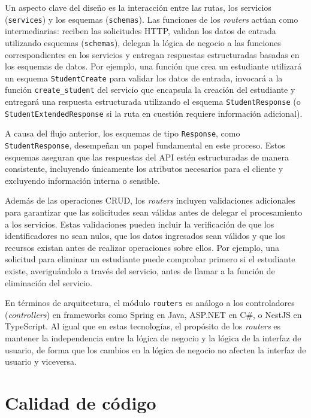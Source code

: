 Un aspecto clave del diseño es la interacción entre las rutas, los servicios (\lstinline|services|) y los esquemas (\lstinline|schemas|). Las funciones de los \textit{routers} actúan como intermediarias: reciben las solicitudes \gls{HTTP}, validan los datos de entrada utilizando esquemas (\lstinline|schemas|), delegan la lógica de negocio a las funciones correspondientes en los servicios y entregan respuestas estructuradas basadas en los esquemas de datos. Por ejemplo, una función que crea un estudiante utilizará un esquema \lstinline|StudentCreate| para validar los datos de entrada, invocará a la función \lstinline|create_student| del servicio que encapsula la creación del estudiante y entregará una respuesta estructurada utilizando el esquema \lstinline|StudentResponse| (o \lstinline|StudentExtendedResponse| si la ruta en cuestión requiere información adicional).

\sloppy
A causa del flujo anterior, los esquemas de tipo \lstinline|Response|, como \lstinline|StudentResponse|, desempeñan un papel fundamental en este proceso. Estos esquemas aseguran que las respuestas del \gls{API} estén estructuradas de manera consistente, incluyendo únicamente los atributos necesarios para el cliente y excluyendo información interna o sensible.
\fussy

Además de las operaciones \gls{CRUD}, los \textit{routers} incluyen validaciones adicionales para garantizar que las solicitudes sean válidas antes de delegar el procesamiento a los servicios. Estas validaciones pueden incluir la verificación de que los identificadores no sean nulos, que los datos ingresados sean válidos y que los recursos existan antes de realizar operaciones sobre ellos. Por ejemplo, una solicitud para eliminar un estudiante puede comprobar primero si el estudiante existe, averiguándolo a través del servicio, antes de llamar a la función de eliminación del servicio.

En términos de arquitectura, el módulo \lstinline|routers| es análogo a los controladores (\textit{controllers}) en frameworks como Spring en Java, ASP.NET en C\#, o NestJS en TypeScript. Al igual que en estas tecnologías, el propósito de los \textit{routers} es mantener la independencia entre la lógica de negocio y la lógica de la interfaz de usuario, de forma que los cambios en la lógica de negocio no afecten la interfaz de usuario y viceversa.

\section{Calidad de código}
\label{sec:calidad_codigo}

